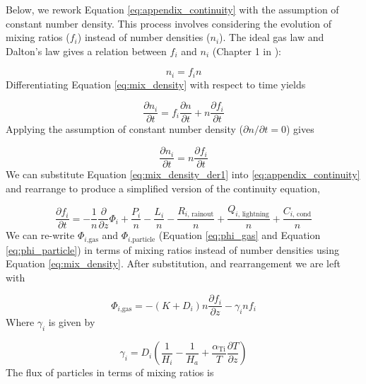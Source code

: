 Below, we rework Equation \eqref{eq:appendix_continuity} with the assumption of constant number density. This process involves considering the evolution of mixing ratios ($f_i$) instead of number densities ($n_i$). The ideal gas law and Dalton's law gives a relation between $f_i$ and $n_i$ (Chapter 1 in \citet{Catling_2017}):

\begin{equation} \label{eq:mix_density}
  n_i = f_i n
\end{equation}
Differentiating Equation \eqref{eq:mix_density} with respect to time yields

\begin{equation} \label{eq:mix_density_der}
  \frac{\partial n_i}{\partial t} = f_i \frac{\partial n}{\partial t} + n \frac{\partial f_i}{\partial t}
\end{equation}
Applying the assumption of constant number density ($\partial n / \partial t = 0$) gives

\begin{equation} \label{eq:mix_density_der1}
  \frac{\partial n_i}{\partial t} = n \frac{\partial f_i}{\partial t}
\end{equation}
We can substitute Equation \eqref{eq:mix_density_der1} into \eqref{eq:appendix_continuity} and rearrange to produce a simplified version of the continuity equation,

\begin{equation} \label{eq:appen_continuity_simple}
  \frac{\partial f_{i}}{\partial t} = - \frac{1}{n}\frac{\partial}{\partial z}\Phi_{i} + \frac{P_{i}}{n} - \frac{L_{i}}{n} - \frac{R_{i\text{, rainout}}}{n} + \frac{Q_{i\text{, lightning}}}{n} + \frac{C_{i\text{, cond}}}{n}
\end{equation}
We can re-write $\Phi_{i\text{,gas}}$ and $\Phi_{i\text{,particle}}$ (Equation \eqref{eq:phi_gas} and Equation \eqref{eq:phi_particle}) in terms of mixing ratios instead of number densities using Equation \eqref{eq:mix_density}. After substitution, and rearrangement we are left with

\begin{equation} \label{eq:phi_gas_1}
  \Phi_{i\text{,gas}} = - \left( K + D_{i} \right)n\frac{\partial f_{i}}{\partial z} - \gamma_{i}nf_{i}
\end{equation}
Where $\gamma_{i}$ is given by

\begin{equation}
  \gamma_{i} = D_{i}\left( \frac{1}{H_{i}} - \frac{1}{H_{a}} + \frac{\alpha_{\text{Ti}}}{T}\frac{\partial T}{\partial z} \right)
\end{equation}
The flux of particles in terms of mixing ratios is

